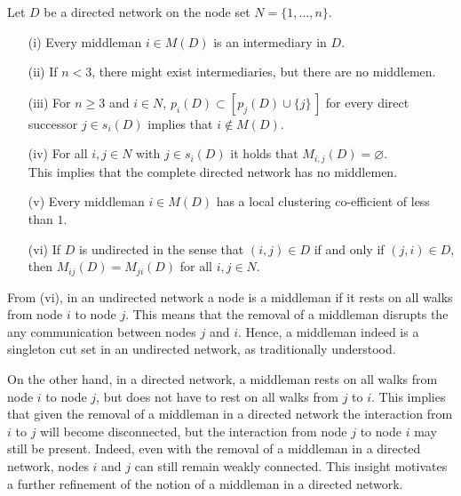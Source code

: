 \begin{proposition}\label{TheoremIntermediary}
Let $D$ be a directed network on the node set $N = \{ 1, \ldots ,n \}$.
\begin{itemize}
\item[(i)] Every middleman $i \in M(D)$ is an intermediary in $D$. 

\item[(ii)] If $n < 3$, there might exist intermediaries, but there are no middlemen.

\item[(iii)] For $n \geqslant 3$ and $i \in N$, $p_{i}(D) \subset \left[ p_{j}(D) \cup \{ j \} \, \right]$ for every direct successor $j \in s_{i}(D)$ implies that $i \notin M(D)$.

\item[(iv)] For all $i,j \in N$ with $j \in s_{i}(D)$ it holds that $M_{i,j}(D) = \varnothing$.
\\
This implies that the complete directed network has no middlemen.

\item[(v)] Every middleman $i \in M(D)$ has a local clustering co-efficient of less than $1$.

\item[(vi)] If $D$ is undirected in the sense that $(i,j) \in D$ if and only if $(j,i) \in D$, then $M_{ij} (D) = M_{ji} (D)$ for all $i,j \in N$.
\end{itemize}
\end{proposition}

From (vi), in an undirected network a node is a middleman if it rests on all walks from node $i$ to node $j$. This means that the removal of a middleman disrupts the any communication between nodes $j$ and $i$. Hence, a middleman indeed is a singleton cut set in an undirected network, as traditionally understood.

On the other hand, in a directed network, a middleman rests on all walks from node $i$ to node $j$, but does not have to rest on all walks from $j$ to $i$. This implies that given the removal of a middleman in a directed network the interaction from $i$ to $j$ will become disconnected, but the interaction from node $j$ to node $i$ may still be present. Indeed, even with the removal of a middleman in a directed network, nodes $i$ and $j$ can still remain weakly connected. This insight motivates a further refinement of the notion of a middleman in a directed network.

